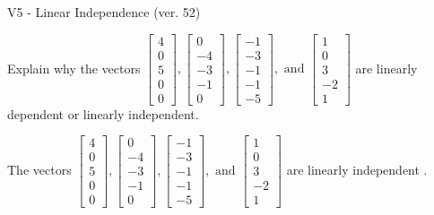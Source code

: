 \begin{exercise}
  \begin{exerciseTitle}V5 - Linear Independence (ver. 52)\end{exerciseTitle}
  \begin{exerciseStatement}
    Explain why the vectors \(\left[\begin{array}{r}
4 \\
0 \\
5 \\
0 \\
0
\end{array}\right] , \left[\begin{array}{r}
0 \\
-4 \\
-3 \\
-1 \\
0
\end{array}\right] , \left[\begin{array}{r}
-1 \\
-3 \\
-1 \\
-1 \\
-5
\end{array}\right] , \text{ and } \left[\begin{array}{r}
1 \\
0 \\
3 \\
-2 \\
1
\end{array}\right]\) are linearly dependent or linearly independent.	


  \end{exerciseStatement}
  \begin{exerciseAnswer}
   The vectors \(\left[\begin{array}{r}
4 \\
0 \\
5 \\
0 \\
0
\end{array}\right] , \left[\begin{array}{r}
0 \\
-4 \\
-3 \\
-1 \\
0
\end{array}\right] , \left[\begin{array}{r}
-1 \\
-3 \\
-1 \\
-1 \\
-5
\end{array}\right] , \text{ and } \left[\begin{array}{r}
1 \\
0 \\
3 \\
-2 \\
1
\end{array}\right]\) are 
  	 linearly independent  .
  


  \end{exerciseAnswer}
\end{exercise}